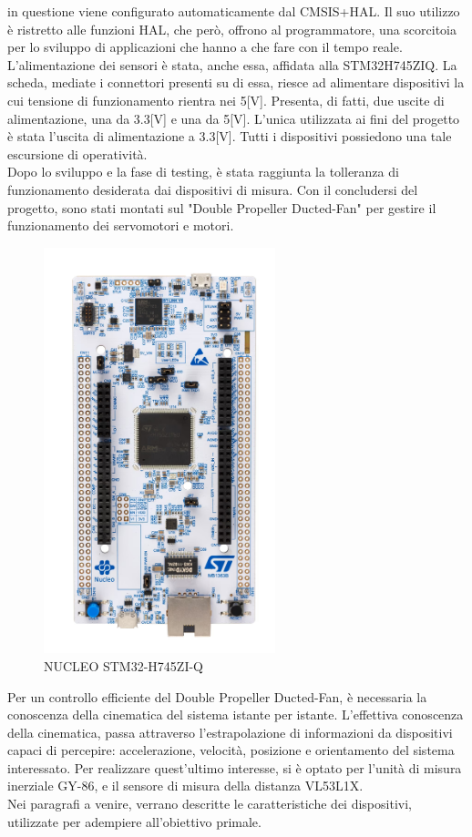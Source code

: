 \documentclass[11pt]{report}
\begin{document}
in questione viene configurato automaticamente dal CMSIS+HAL. Il suo utilizzo è ristretto alle funzioni HAL, che però, offrono al programmatore, una scorcitoia per lo sviluppo di applicazioni che hanno a che fare con il tempo reale.\\
L'alimentazione dei sensori è stata, anche essa, affidata alla STM32H745ZIQ. La scheda, mediate i connettori presenti su di essa, riesce ad alimentare dispositivi la cui tensione di funzionamento rientra nei 5[V]. Presenta, di fatti, due uscite di alimentazione, una da 3.3[V] e una da 5[V]. L'unica utilizzata ai fini del progetto è stata l'uscita di alimentazione a 3.3[V]. Tutti i dispositivi possiedono una tale escursione di operatività.\\
Dopo lo sviluppo e la fase di testing, è stata raggiunta la tolleranza di funzionamento desiderata dai dispositivi di misura. Con il concludersi del progetto, sono stati montati sul "Double Propeller Ducted-Fan" per gestire il funzionamento dei servomotori e motori.
\begin{figure}[H]
    \centering
    \includegraphics[width = 0.6\textwidth]{images/Immagine_1_relazione__IMMAGINE_STM32H745ZIQ.jpg}
    \caption{NUCLEO STM32-H745ZI-Q}
    \label{fig:etichetta}
\end{figure}
Per un controllo efficiente del Double Propeller Ducted-Fan, è necessaria la conoscenza della cinematica del sistema istante per istante.
L'effettiva conoscenza della cinematica, passa attraverso l'estrapolazione di informazioni da dispositivi capaci di percepire: accelerazione, velocità, posizione e orientamento del sistema interessato.
Per realizzare quest'ultimo interesse, si è optato per l'unità di misura inerziale GY-86, e il sensore di misura della distanza VL53L1X.\\
Nei paragrafi a venire, verrano descritte le caratteristiche dei dispositivi, utilizzate per adempiere all'obiettivo primale.
\end{document}
